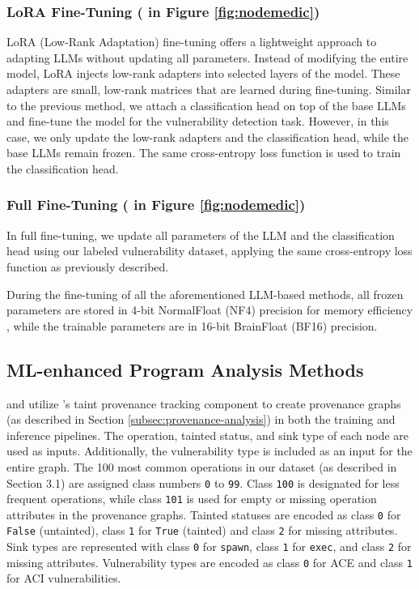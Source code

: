 \documentclass[12pt,openany,oneside,table]{cmuthesis}
\begin{document}
\subsubsection{LoRA Fine-Tuning \textup{( in Figure \ref{fig:nodemedic})}}

LoRA (Low-Rank Adaptation) fine-tuning \cite{lora, qlora} offers a lightweight approach to adapting LLMs without updating all parameters. Instead of modifying the entire model, LoRA injects low-rank adapters into selected layers of the model. These adapters are small, low-rank matrices that are learned during fine-tuning. Similar to the previous method, we attach a classification head on top of the base LLMs and fine-tune the model for the vulnerability detection task. However, in this case, we only update the low-rank adapters and the classification head, while the base LLMs remain frozen. The same cross-entropy loss function is used to train the classification head.

\subsubsection{Full Fine-Tuning \textup{( in Figure \ref{fig:nodemedic})}}

In full fine-tuning, we update all parameters of the LLM and the classification head using our labeled vulnerability dataset, applying the same cross-entropy loss function as previously described.

During the fine-tuning of all the aforementioned LLM-based methods, all frozen parameters are stored in 4-bit NormalFloat (NF4) precision for memory efficiency \cite{qlora}, while the trainable parameters are in 16-bit BrainFloat (BF16) precision.

\subsection{ML-enhanced Program Analysis Methods}\label{subsec:ml_enhanced}

 and  utilize \nodemedic's
taint provenance tracking component to create provenance graphs (as described in Section \ref{subsec:provenance-analysis}) in both the training and inference pipelines. The operation, tainted status, and sink type of each node are used as inputs. Additionally, the vulnerability type is included as an input for the entire graph. The 100 most common operations in our dataset (as described in Section 3.1) are assigned class numbers \texttt{0} to \texttt{99}. Class \texttt{100} is designated for less frequent operations, while class \texttt{101} is used for empty or missing operation attributes in the provenance graphs. Tainted statuses are encoded as class \texttt{0} for \texttt{False} (untainted), class \texttt{1} for \texttt{True} (tainted) and class \texttt{2} for missing attributes. Sink types are represented with class \texttt{0} for \texttt{spawn}, class \texttt{1} for \texttt{exec}, and class \texttt{2} for missing attributes. Vulnerability types are encoded as class \texttt{0} for ACE and class \texttt{1} for ACI vulnerabilities.
\end{document}
